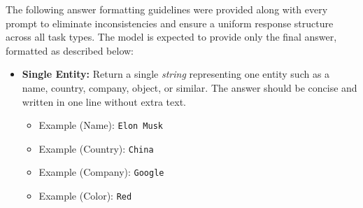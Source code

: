 \documentclass[11pt]{article}
\begin{document}
The following answer formatting guidelines were provided along with every prompt to eliminate inconsistencies and ensure a uniform response structure across all task types. 
The model is expected to provide only the final answer, formatted as described below:
\vspace{-0.5em}
\begin{itemize}
    \item \textbf{Single Entity:}  
    Return a single \textit{string} representing one entity such as a name, country, company, object, or similar.  
    The answer should be concise and written in one line without extra text.  
    \vspace{-0.75em}
    \begin{itemize}
        \item Example (Name): \texttt{Elon Musk} 
        \vspace{-0.2em}
        \item Example (Country): \texttt{China}
        \vspace{-0.2em}
        \item Example (Company): \texttt{Google} 
        \vspace{-0.2em}
        \item Example (Color): \texttt{Red}
    \end{itemize}
    
    \vspace{-0.5em}
    

\end{itemize}
\end{document}
